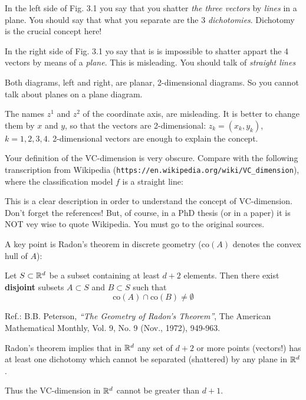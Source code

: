 \begin{description}[style=unboxed,leftmargin=0cm,itemsep=3ex]
In the left side of Fig. 3.1 you say that you shatter {\em the three vectors\/}
by {\em lines\/} in a plane.
You should say that what you separate are the 3 {\em dichotomies\/}.
Dichotomy is the crucial concept here!

In the right side of Fig. 3.1 yo say that is is impossible to shatter appart
the 4 vectors by means of a {\em plane\/}.
This is misleading.
You should talk of {\em straight lines\/}

Both diagrams, left and right, are planar, 2-dimensional diagrams.
So you cannot talk about planes on a plane diagram.

The names $z^1$ and $z^2$ of the coordinate axis, are misleading.
It is better to change them by $x$ and $y$, so that the vectors are
2-dimensional: $z_k=(x_k,y_k)$,  $k=1,2,3,4$.
2-dimensional vectors are enough to explain the concept.

Your definition of the VC-dimension is very obscure.
Compare with the following transcription from Wikipedia
(\texttt{https://en.wikipedia.org/wiki/VC\_dimension}),
where the classification model $f$ is a straight line: 

\vspace{2ex}

\vspace{3ex}
This is a clear description in order to understand the concept of
VC-dimension.
Don't forget the references!
But, of course, in a PhD thesis (or in a paper) it is NOT vey wise to
quote Wikipedia.
You must go to the original sources.

A key point is Radon's theorem in discrete geometry
($\text{co}(A)$ denotes the convex hull of $A$):

\begin{theorem}[J. Radon]
Let $S\subset{\mathbb R }^d$ be a subset containing at least $d+2$ elements. 
Then there exist {\bf disjoint} subsets $A\subset S$ and $B\subset S$
such that
$$
\text{co}(A)\cap\text{co}(B)\neq\emptyset
$$
\end{theorem}
\noindent
Ref.: B.B. Peterson, {\em ``The Geometry of Radon's Theorem''\/}, The
American Mathematical Monthly, Vol. 9, No. 9 (Nov., 1972), 949-963.

\vspace{2ex}
Radon's theorem implies that in ${\mathbb R }^d$ any set of $d+2$ or more points
(vectors!) has at least one dichotomy which cannot be separated (shattered)
by any plane in ${\mathbb R }^d$.

Thus the VC-dimension in ${\mathbb R }^d$ cannot be greater than $d+1$.


\end{description}



